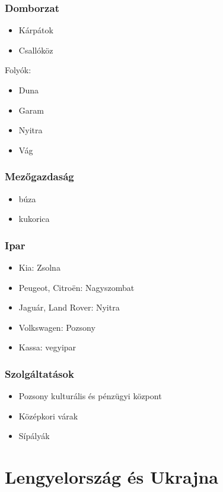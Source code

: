 \documentclass{article}
\begin{document}
\subsubsection{Domborzat}
\begin{itemize}
    \item Kárpátok
    \item Csallóköz
\end{itemize}
Folyók:
\begin{itemize}
    \item Duna
    \item Garam
    \item Nyitra
    \item Vág
\end{itemize}

\subsubsection{Mezőgazdaság}
\begin{itemize}
    \item búza
    \item kukorica
\end{itemize}

\subsubsection{Ipar}
\begin{itemize}
    \item Kia: Zsolna
    \item Peugeot, Citroën: Nagyszombat
    \item Jaguár, Land Rover: Nyitra
    \item Volkswagen: Pozsony
    \item Kassa: vegyipar
\end{itemize}

\subsubsection{Szolgáltatások}
\begin{itemize}
    \item Pozsony kulturális és pénzügyi központ
    \item Középkori várak
    \item Sípályák
\end{itemize}

\section{Lengyelország és Ukrajna}
\end{document}
